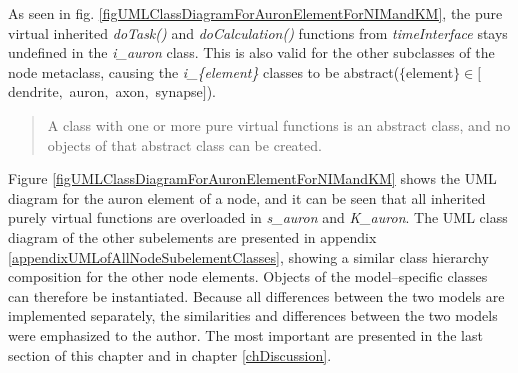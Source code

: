 		As seen in fig. \ref{figUMLClassDiagramForAuronElementForNIMandKM}, the pure virtual inherited \emph{doTask()} and \emph{doCalculation()} functions from \emph{timeInterface} stays undefined in the \emph{i\_auron} class.
		This is also valid for the other subclasses of the node metaclass, causing the \emph{i\_\{element\}} classes to be abstract($\{$element$\} \in [$dendrite$,$ auron$,$ axon$,$ synapse$]$). %
\begin{quote}
	A class with one or more pure virtual functions is an abstract class, and no objects of that abstract class can be created. \cite{Stroustrup2000KAP12}
\end{quote}

		Figure \ref{figUMLClassDiagramForAuronElementForNIMandKM} shows the UML diagram for the auron element of a node, and it can be seen that all inherited purely virtual functions are overloaded in \emph{s\_auron} and \emph{K\_auron}.
		The UML class diagram of the other subelements are presented in appendix \ref{appendixUMLofAllNodeSubelementClasses}, showing a similar class hierarchy composition for the other node elements. %
		Objects of the model--specific classes can therefore be instantiated.
		Because all differences between the two models are implemented separately, the similarities and differences between the two models were emphasized to the author.
		The most important are presented in the last section of this chapter and in chapter \ref{chDiscussion}.


